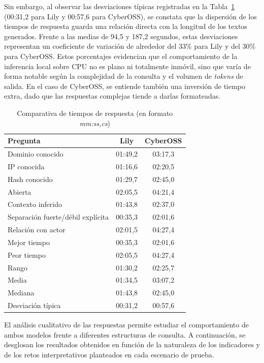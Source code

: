\documentclass[12pt]{report}
\begin{document}
Sin embargo, al observar las desviaciones típicas registradas en la Tabla~\ref{tab:tiempos} (00:31,2 para Lily y 00:57,6 para CyberOSS), se constata que la dispersión de los tiempos de respuesta guarda una relación directa con la longitud de los textos generados. Frente a las medias de 94,5 y 187,2 segundos, estas desviaciones representan un coeficiente de variación de alrededor del 33\% para Lily y del 30\% para CyberOSS. Estos porcentajes evidencian que el comportamiento de la inferencia local sobre CPU no es plano ni totalmente inmóvil, sino que varía de forma notable según la complejidad de la consulta y el volumen de \textit{tokens} de salida. En el caso de CyberOSS, se entiende también una inversión de tiempo extra, dado que las respuestas complejas tiende a darlas formateadas.

\begin{table}[H]
	\centering
	\small
	\begin{tabular}{ l c c }
		\toprule
		\textbf{Pregunta} & \textbf{Lily} & \textbf{CyberOSS}  \\
		\midrule
		Dominio conocido & 01:49,2 & 03:17,3 \\
		IP conocida & 01:16,6 & 02:20,5 \\
		Hash conocido & 01:29,7 & 02:45,0 \\
		Abierta & 02:05,5 & 04:21,4 \\
		Contexto inferido & 01:43,8 & 02:37,0 \\
		Separación fuerte/débil explícita & 00:35,3 & 02:01,6 \\
		Relación con actor & 02:01,5 & 04:27,4 \\
		\midrule
		Mejor tiempo & 00:35,3 & 02:01,6 \\
		Peor tiempo & 02:05,5 & 04:27,4 \\
		Rango & 01:30,2 & 02:25,7 \\
		Media & 01:34,5 & 03:07,2 \\
		Mediana & 01:43,8 & 02:45,0 \\
		Desviación típica & 00:31,2 & 00:57,6 \\
		\bottomrule
	\end{tabular}
	\caption{Comparativa de tiempos de respuesta (en formato \textit{mm:ss,cs})}
	\label{tab:tiempos}
\end{table}

El análisis cualitativo de las respuestas permite estudiar el comportamiento de ambos modelos frente a diferentes estructuras de consulta. A continuación, se desglosan los resultados obtenidos en función de la naturaleza de los indicadores y de los retos interpretativos planteados en cada escenario de prueba.
\end{document}
